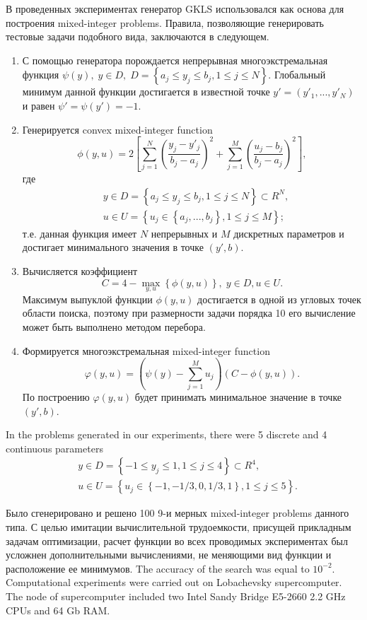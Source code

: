 \documentclass[
11pt,%
tightenlines,%
twoside,%
onecolumn,%
nofloats,%
nobibnotes,%
nofootinbib,%
superscriptaddress,%
noshowpacs,%
centertags]%
{revtex4}
\begin{document}
В проведенных экспериментах генератор GKLS использовался как основа для построения mixed-integer problems. Правила, позволяющие генерировать тестовые задачи подобного вида, заключаются в следующем.

\begin{enumerate}
	\item С помощью генератора порождается непрерывная многоэкстремальная функция $\psi(y), \; y\in D, \; D = \left\{ a_j\leq y_j\leq b_j, 1\leq j \leq N \right\}$. Глобальный минимум данной функции достигается в известной точке $y'=(y'_1,...,y'_N)$ и равен $\psi'=\psi(y')=-1$.
	\item Генерируется convex mixed-integer function 
	\[
			\phi (y,u) = 2 \left[ \sum_{j=1}^N \left( \frac{y_j - y'_j}{b_j-a_j} \right)^2 + \sum_{j=1}^M \left( \frac{u_j - b_j}{b_j-a_j} \right)^2 \right],
	\]
	где 
	\begin{eqnarray*}
	& y\in D = \left\{ a_j\leq y_j\leq b_j, 1\leq j \leq N \right\} \subset R^N, \\
	& u\in U = \left\{ u_j \in  \left\{a_j, ..., b_j \right\}, 1\leq j \leq M \right\};
	\end{eqnarray*}
	т.е. данная функция имеет $N$ непрерывных и $M$ дискретных параметров и достигает минимального значения в точке $(y',b)$.
	\item Вычисляется коэффициент 
	\[
	C = 4 - \max_{y,u} \left\{ \phi(y,u) \right\}, \; y\in D, u \in U.
	\]
	Максимум выпуклой функции $\phi(y,u)$ достигается в одной из угловых точек области поиска, поэтому при размерности задачи порядка 10 его вычисление может быть выполнено методом перебора.
	\item Формируется многоэкстремальная mixed-integer function 
	\[
	\varphi(y,u) = \left(\psi(y) - \sum_{j=1}^M{u_j}\right)\left(C - \phi(y,u)\right).
	\]
	По построению $\varphi(y,u)$  будет принимать минимальное значение в точке $(y',b)$.
	
\end{enumerate}


In the problems generated in our experiments, there were 5 discrete and 4 continuous parameters 
	\begin{eqnarray*}
	& y\in D = \left\{ -1 \leq y_j\leq 1, 1\leq j \leq 4 \right\} \subset R^4, \\
	& u\in U = \left\{ u_j \in  \left\{-1, -1/3, 0, 1/3, 1 \right\}, 1\leq j \leq 5 \right\}.
	\end{eqnarray*}


Было сгенерировано и решено 100 9-и мерных mixed-integer problems данного типа. С целью имитации вычислительной трудоемкости, присущей прикладным задачам оптимизации, расчет функции во всех проводимых экспериментах был усложнен дополнительными вычислениями, не меняющими вид функции и расположение ее минимумов.
The accuracy of the search was equal to $10^{-2}$. Computational experiments were carried out on Lobachevsky supercomputer. The node of supercomputer included two Intel Sandy Bridge E5-2660 2.2 GHz CPUs and 64 Gb RAM. 
\end{document}
